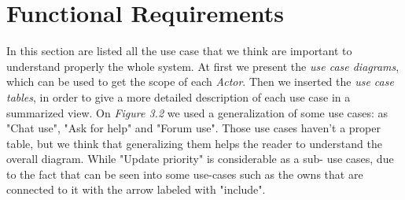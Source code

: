 \documentclass[10pt]{report}
\begin{document}
\section{Functional Requirements}
In this section are listed all the use case that we think are important to understand properly the whole system. At first we present the \textit{use case diagrams}, which can be used to get the scope of each \textit{Actor}. Then we inserted the \textit{use case tables}, in order to give a more detailed description of each use case in a summarized view. 
On \textit{Figure 3.2} we used a generalization of some use cases: as "Chat use", "Ask for help" and "Forum use". Those use cases haven't a proper table, but we think that generalizing them helps the reader to understand the overall diagram. While "Update priority" is considerable as a sub- use cases, due to the fact that can be seen into some use-cases such as the owns that are connected to it with the arrow labeled with "include". 
\end{document}
